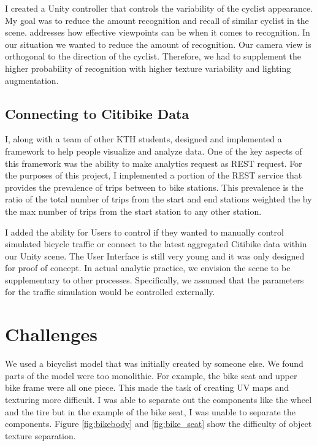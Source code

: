 \documentclass{scrartcl}
\begin{document}
	I created a Unity controller that controls the variability of the cyclist appearance.  My goal was to reduce the amount recognition and recall of similar cyclist in the scene.  	\citep{memory} addresses how effective viewpoints can be when it comes to recognition.  In our situation we wanted to reduce the amount of recognition.  Our camera view is orthogonal to the direction of the cyclist.  Therefore, we had to supplement the higher probability of recognition with higher texture variability and lighting augmentation.	
		
	\subsection{Connecting to Citibike Data} 		
		
	I, along with a team of other KTH students, designed and implemented a framework to help people visualize and analyze data.  One of the key aspects of this 			framework was the ability to make analytics request as REST request.  For the purposes of this project, I implemented a portion of the REST service that provides the 	prevalence of trips between to bike stations.  This prevalence is the ratio of the total number of trips from the start and end stations weighted the by the max number of 	trips from the start station to any other station.  

	I added the ability for Users to control if they wanted to manually control simulated bicycle traffic or connect to the latest aggregated Citibike data within our Unity scene.  	The User Interface is still very young and it was only designed for proof of concept.  In actual analytic practice, we envision the scene to be supplementary to other 		processes.  Specifically, we assumed that the parameters for the traffic simulation would be controlled externally.
		
\section{Challenges} 		
	
We used a bicyclist model that was initially created by someone else.  We found parts of the model were too monolithic.  For example, the bike seat and upper bike 		frame were all one piece.  This made the task of creating UV maps and texturing more difficult.  I was able to separate out the components like the wheel and the tire but in the example of the bike seat, I was unable to separate the components.  Figure \ref{fig:bikebody} and \ref{fig:bike_seat} show the difficulty of object texture separation.
\end{document}
